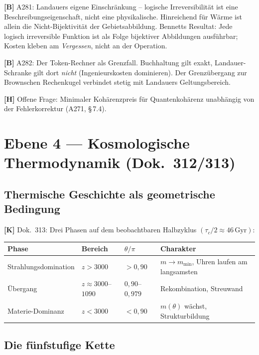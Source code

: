 \textbf{[B]} A281: Landauers eigene Einschränkung – logische Irreversibilität
ist eine Beschreibungseigenschaft, nicht eine physikalische.
Hinreichend für Wärme ist allein die Nicht-Bijektivität der
Gebietsabbildung. Bennetts Resultat: Jede logisch irreversible Funktion
ist als Folge bijektiver Abbildungen ausführbar; Kosten kleben am
\emph{Vergessen}, nicht an der Operation.

\textbf{[B]} A282: Der Token-Rechner als Grenzfall. Buchhaltung gilt exakt,
Landauer-Schranke gilt dort \emph{nicht} (Ingenieurskosten dominieren).
Der Grenzübergang zur Brownschen Rechenkugel verbindet stetig mit
Landauers Geltungsbereich.

\textbf{[H]} Offene Frage: Minimaler Kohärenzpreis für Quantenkohärenz
unabhängig von der Fehlerkorrektur (A271, \S\,7.4).

\section{Ebene 4 --- Kosmologische Thermodynamik (Dok.~312/313)}

\subsection{Thermische Geschichte als geometrische Bedingung}

\textbf{[K]} Dok.~313: Drei Phasen auf dem beobachtbaren Halbzyklus
$(\tau_c/2 \approx 46\,\text{Gyr})$:

\begin{center}
	\small
	\begin{tabular}{llll}
		\toprule
		Phase & Bereich & $\theta/\pi$ & Charakter \\
		\midrule
		Strahlungsdomination & $z > 3000$ & $> 0{,}90$ &
		$m \to m_\text{min}$, Uhren laufen am langsamsten \\
		Übergang & $z \approx 3000$--$1090$ & $0{,}90$--$0{,}979$ &
		Rekombination, Streuwand \\
		Materie-Dominanz & $z < 3000$ & $< 0{,}90$ &
		$m(\theta)$ wächst, Strukturbildung \\
		\bottomrule
	\end{tabular}
\end{center}

\subsection{Die fünfstufige Kette}


